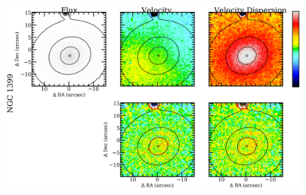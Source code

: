 		\begin{figure}
			\centering
			\includegraphics[height=0.31\textheight]{chapter4/muse/kin2.png}
		\end{figure}



